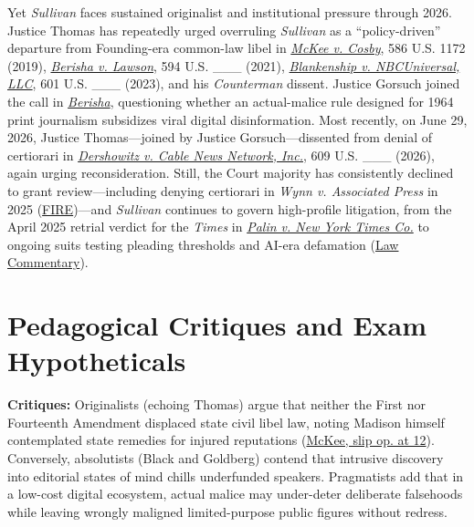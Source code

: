 \documentclass[12pt]{article}
\begin{document}
Yet \textit{Sullivan} faces sustained originalist and institutional pressure through 2026. Justice Thomas has repeatedly urged overruling \textit{Sullivan} as a ``policy-driven'' departure from Founding-era common-law libel in \textit{\href{https://www.supremecourt.gov/opinions/18pdf/17-1542_ihdk.pdf}{McKee v. Cosby}}, 586 U.S. 1172 (2019), \textit{\href{https://www.supremecourt.gov/opinions/20pdf/20-1063_new_gfbi.pdf}{Berisha v. Lawson}}, 594 U.S. \_\_\_ (2021), \textit{\href{https://www.supremecourt.gov/opinions/23pdf/22-1125_c07d.pdf}{Blankenship v. NBCUniversal, LLC}}, 601 U.S. \_\_\_ (2023), and his \textit{Counterman} dissent. Justice Gorsuch joined the call in \textit{\href{https://www.supremecourt.gov/opinions/20pdf/20-1063_new_gfbi.pdf}{Berisha}}, questioning whether an actual-malice rule designed for 1964 print journalism subsidizes viral digital disinformation. Most recently, on June 29, 2026, Justice Thomas---joined by Justice Gorsuch---dissented from denial of certiorari in \textit{\href{https://www.supremecourt.gov/opinions/25pdf/25-770_2c8f.pdf}{Dershowitz v. Cable News Network, Inc.}}, 609 U.S. \_\_\_ (2026), again urging reconsideration. Still, the Court majority has consistently declined to grant review---including denying certiorari in \textit{Wynn v. Associated Press} in 2025 (\href{https://www.fire.org/news/blogs/ronald-kl-collins-first-amendment-news/trumps-executive-orders-due-process-breathtaking}{FIRE})---and \textit{Sullivan} continues to govern high-profile litigation, from the April 2025 retrial verdict for the \textit{Times} in \textit{\href{https://caselaw.findlaw.com/court/us-dis-crt-sd-new-yor/118036252.html}{Palin v. New York Times Co.}} to ongoing suits testing pleading thresholds and AI-era defamation (\href{https://www.lawcommentary.com/articles/trump-new-york-times-defamation-lawsuit-actual-malice}{Law Commentary}).

\section{Pedagogical Critiques and Exam Hypotheticals}
\textbf{Critiques:} Originalists (echoing Thomas) argue that neither the First nor Fourteenth Amendment displaced state civil libel law, noting Madison himself contemplated state remedies for injured reputations (\href{https://www.supremecourt.gov/opinions/18pdf/17-1542_ihdk.pdf}{McKee, slip op. at 12}). Conversely, absolutists (Black and Goldberg) contend that intrusive discovery into editorial states of mind chills underfunded speakers. Pragmatists add that in a low-cost digital ecosystem, actual malice may under-deter deliberate falsehoods while leaving wrongly maligned limited-purpose public figures without redress.
\end{document}
